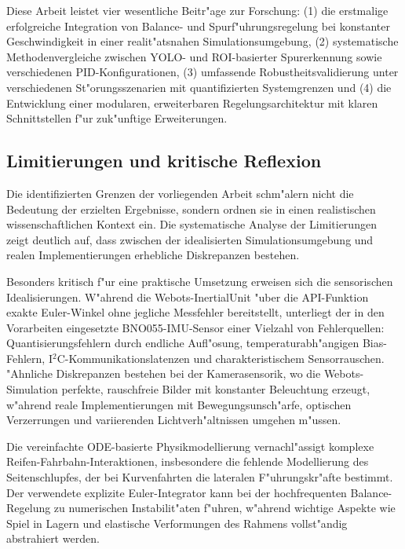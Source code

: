 Diese Arbeit leistet vier wesentliche Beitr{"a}ge zur Forschung: (1) die erstmalige erfolgreiche Integration von Balance- 
und Spurf{"u}hrungsregelung bei konstanter Geschwindigkeit in einer realit{"a}tsnahen Simulationsumgebung, (2) systematische 
Methodenvergleiche zwischen YOLO- und ROI-basierter Spurerkennung sowie verschiedenen PID-Konfigurationen, (3) umfassende 
Robustheitsvalidierung unter verschiedenen St{"o}rungsszenarien mit quantifizierten Systemgrenzen und (4) die Entwicklung 
einer modularen, erweiterbaren Regelungsarchitektur mit klaren Schnittstellen f{"u}r zuk{"u}nftige Erweiterungen.

\subsection{Limitierungen und kritische Reflexion}

Die identifizierten Grenzen der vorliegenden Arbeit schm{"a}lern nicht die Bedeutung der erzielten Ergebnisse, sondern ordnen 
sie in einen realistischen wissenschaftlichen Kontext ein. Die systematische Analyse der Limitierungen zeigt deutlich auf, 
dass zwischen der idealisierten Simulationsumgebung und realen Implementierungen erhebliche Diskrepanzen bestehen.

Besonders kritisch f{"u}r eine praktische Umsetzung erweisen sich die sensorischen Idealisierungen. W{"a}hrend die Webots-InertialUnit 
{"u}ber die API-Funktion exakte Euler-Winkel ohne jegliche Messfehler bereitstellt, unterliegt der in den Vorarbeiten eingesetzte 
BNO055-IMU-Sensor einer Vielzahl von Fehlerquellen: Quantisierungsfehlern durch endliche Aufl{"o}sung, temperaturabh{"a}ngigen 
Bias-Fehlern, I$^2$C-Kommunikationslatenzen und charakteristischem Sensorrauschen. {"A}hnliche Diskrepanzen bestehen bei der 
Kamerasensorik, wo die Webots-Simulation perfekte, rauschfreie Bilder mit konstanter Beleuchtung erzeugt, w{"a}hrend reale 
Implementierungen mit Bewegungsunsch{"a}rfe, optischen Verzerrungen und variierenden Lichtverh{"a}ltnissen umgehen m{"u}ssen.

Die vereinfachte ODE-basierte Physikmodellierung vernachl{"a}ssigt komplexe Reifen-Fahrbahn-Interaktionen, insbesondere die 
fehlende Modellierung des Seitenschlupfes, der bei Kurvenfahrten die lateralen F{"u}hrungskr{"a}fte bestimmt. Der verwendete 
explizite Euler-Integrator kann bei der hochfrequenten Balance-Regelung zu numerischen Instabilit{"a}ten f{"u}hren, w{"a}hrend 
wichtige Aspekte wie Spiel in Lagern und elastische Verformungen des Rahmens vollst{"a}ndig abstrahiert werden.

